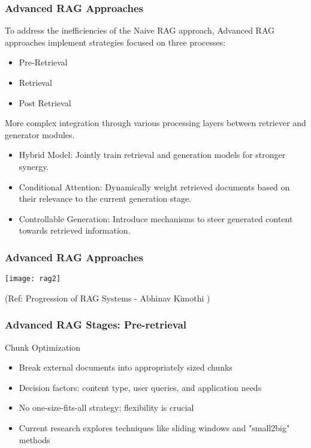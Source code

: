 \begin{frame}[fragile]\frametitle{Advanced RAG Approaches}

To  address  the  inefficiencies  of  the  Naive  RAG  approach,  Advanced  RAG
approaches implement strategies focused on three processes:
\begin{itemize}
\item Pre-Retrieval
\item Retrieval
\item Post Retrieval
\end{itemize}	

More complex integration through various processing layers between retriever and generator modules.

\begin{itemize}
\item Hybrid Model: Jointly train retrieval and generation models for stronger synergy.
\item Conditional Attention: Dynamically weight retrieved documents based on their relevance to the current generation stage.
\item Controllable Generation: Introduce mechanisms to steer generated content towards retrieved information.
\end{itemize}	

\end{frame}

\begin{frame}[fragile]\frametitle{Advanced RAG Approaches}

\begin{center}
\texttt{[image: rag2]}

{\tiny (Ref: Progression of RAG Systems - Abhinav Kimothi )}
\end{center}	
\end{frame}


\begin{frame}[fragile]\frametitle{Advanced RAG Stages: Pre-retrieval}
Chunk Optimization

  \begin{itemize}
    \item Break external documents into appropriately sized chunks
    \item Decision factors: content type, user queries, and application needs
    \item No one-size-fits-all strategy; flexibility is crucial
    \item Current research explores techniques like sliding windows and "small2big" methods
  \end{itemize}
\end{frame}

